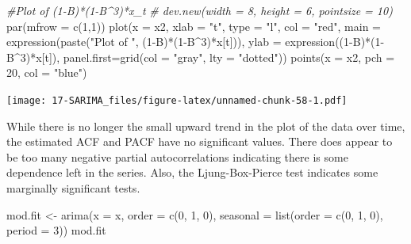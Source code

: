 \documentclass[
]{book}
\newenvironment{Shaded}{\begin{snugshade}}{\end{snugshade}}
\newcommand{\AttributeTok}[1]{\textcolor[rgb]{0.77,0.63,0.00}{#1}}
\newcommand{\CommentTok}[1]{\textcolor[rgb]{0.56,0.35,0.01}{\textit{#1}}}
\newcommand{\DecValTok}[1]{\textcolor[rgb]{0.00,0.00,0.81}{#1}}
\newcommand{\FunctionTok}[1]{\textcolor[rgb]{0.00,0.00,0.00}{#1}}
\newcommand{\NormalTok}[1]{#1}
\newcommand{\OtherTok}[1]{\textcolor[rgb]{0.56,0.35,0.01}{#1}}
\newcommand{\SpecialCharTok}[1]{\textcolor[rgb]{0.00,0.00,0.00}{#1}}
\newcommand{\StringTok}[1]{\textcolor[rgb]{0.31,0.60,0.02}{#1}}
\theoremstyle{definition}
\theoremstyle{definition}
\theoremstyle{definition}
\theoremstyle{definition}
\theoremstyle{remark}
\begin{document}
\begin{Shaded}
\begin{Highlighting}[]
 \CommentTok{\#Plot of (1{-}B)*(1{-}B\^{}3)*x\_t }
  \CommentTok{\# dev.new(width = 8, height = 6, pointsize = 10)}
  \FunctionTok{par}\NormalTok{(}\AttributeTok{mfrow =} \FunctionTok{c}\NormalTok{(}\DecValTok{1}\NormalTok{,}\DecValTok{1}\NormalTok{))}
  \FunctionTok{plot}\NormalTok{(}\AttributeTok{x =}\NormalTok{ x2, }\AttributeTok{xlab =} \StringTok{"t"}\NormalTok{, }\AttributeTok{type =} \StringTok{"l"}\NormalTok{, }\AttributeTok{col =} \StringTok{"red"}\NormalTok{, }\AttributeTok{main =} \FunctionTok{expression}\NormalTok{(}\FunctionTok{paste}\NormalTok{(}\StringTok{"Plot of "}\NormalTok{, (}\DecValTok{1}\SpecialCharTok{{-}}\NormalTok{B)}\SpecialCharTok{*}\NormalTok{(}\DecValTok{1}\SpecialCharTok{{-}}\NormalTok{B}\SpecialCharTok{\^{}}\DecValTok{3}\NormalTok{)}\SpecialCharTok{*}\NormalTok{x[t])), }
      \AttributeTok{ylab =} \FunctionTok{expression}\NormalTok{((}\DecValTok{1}\SpecialCharTok{{-}}\NormalTok{B)}\SpecialCharTok{*}\NormalTok{(}\DecValTok{1}\SpecialCharTok{{-}}\NormalTok{B}\SpecialCharTok{\^{}}\DecValTok{3}\NormalTok{)}\SpecialCharTok{*}\NormalTok{x[t]), }\AttributeTok{panel.first=}\FunctionTok{grid}\NormalTok{(}\AttributeTok{col =} \StringTok{"gray"}\NormalTok{, }\AttributeTok{lty =} \StringTok{"dotted"}\NormalTok{))}
  \FunctionTok{points}\NormalTok{(}\AttributeTok{x =}\NormalTok{ x2, }\AttributeTok{pch =} \DecValTok{20}\NormalTok{, }\AttributeTok{col =} \StringTok{"blue"}\NormalTok{)}
\end{Highlighting}
\end{Shaded}

\texttt{[image: 17-SARIMA\_files/figure-latex/unnamed-chunk-58-1.pdf]}

While there is no longer the small upward trend in the plot of the data over time, the estimated ACF and PACF have no significant values. There does appear to be too many negative partial autocorrelations indicating there is some dependence left in the series. Also, the Ljung-Box-Pierce test indicates some marginally significant tests.

\begin{Shaded}
\begin{Highlighting}[]
\NormalTok{ mod.fit }\OtherTok{\textless{}{-}} \FunctionTok{arima}\NormalTok{(}\AttributeTok{x =}\NormalTok{ x, }\AttributeTok{order =} \FunctionTok{c}\NormalTok{(}\DecValTok{0}\NormalTok{, }\DecValTok{1}\NormalTok{, }\DecValTok{0}\NormalTok{), }\AttributeTok{seasonal =} \FunctionTok{list}\NormalTok{(}\AttributeTok{order =} \FunctionTok{c}\NormalTok{(}\DecValTok{0}\NormalTok{, }\DecValTok{1}\NormalTok{, }\DecValTok{0}\NormalTok{), }\AttributeTok{period =} \DecValTok{3}\NormalTok{))}
\NormalTok{  mod.fit}
\end{Highlighting}
\end{Shaded}
\end{document}
